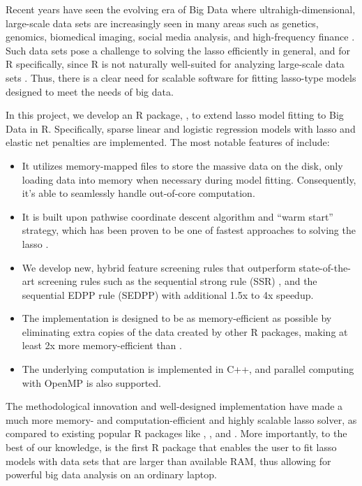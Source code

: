 Recent years have seen the evolving era of Big Data where ultrahigh-dimensional, large-scale data sets are increasingly seen in many areas such as genetics, genomics, biomedical imaging, social media analysis, and high-frequency finance \citep{fan2014challenges}. Such data sets pose a challenge to solving the lasso efficiently in general, and for R specifically, since R is not naturally well-suited for analyzing large-scale data sets \citep{kane2013scalable}. Thus, there is a clear need for scalable software for fitting lasso-type models designed to meet the needs of big data.

In this project, we develop an R package,  \citep{biglasso}, to extend lasso model fitting to Big Data in R. Specifically, sparse linear and logistic regression models with lasso and elastic net penalties are implemented. The most notable features of  include:
\begin{itemize}
\item It utilizes memory-mapped files to store the massive data on the disk, only loading data into memory when necessary during model fitting. Consequently, it's able to seamlessly handle out-of-core computation.
\item It is built upon pathwise coordinate descent algorithm and ``warm start'' strategy, which has been proven to be one of fastest approaches to solving the lasso \citep{friedman2010regularization}.
\item We develop new, hybrid feature screening rules that outperform state-of-the-art screening rules such as the sequential strong rule (SSR) \citep{tibshirani2012strong}, and the sequential EDPP rule (SEDPP) \citep{JMLR:v16:wang15a} with additional 1.5x to 4x speedup.
\item The implementation is designed to be as memory-efficient as possible by eliminating extra copies of the data created by other R packages, making  at least 2x more memory-efficient than .
\item The underlying computation is implemented in C++, and parallel computing with OpenMP is also supported.
\end{itemize}

The methodological innovation and well-designed implementation have made  a much more memory- and computation-efficient and highly scalable lasso solver, as compared to existing popular R packages like  \citep{friedman2010regularization},  \citep{Breheny2011}, and  \citep{picasso}. More importantly, to the best of our knowledge,  is the first R package that enables the user to fit lasso models with data sets that are larger than available RAM, thus allowing for powerful big data analysis on an ordinary laptop.

